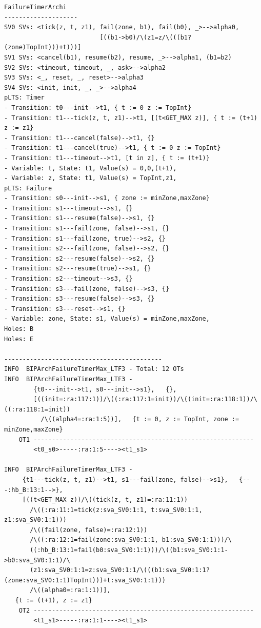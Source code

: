 \documentclass{llncs}
\begin{document}
\small\begin{verbatim}
FailureTimerArchi
--------------------
SV0 SVs: <tick(z, t, z1), fail(zone, b1), fail(b0), _>-->alpha0,
                          [((b1->b0)/\(z1=z/\(((b1?(zone)TopInt)))+t)))]
SV1 SVs: <cancel(b1), resume(b2), resume, _>-->alpha1, (b1=b2)
SV2 SVs: <timeout, timeout, _, ask>-->alpha2
SV3 SVs: <_, reset, _, reset>-->alpha3
SV4 SVs: <init, init, _, _>-->alpha4
pLTS: Timer
- Transition: t0---init-->t1, { t := 0 z := TopInt}
- Transition: t1---tick(z, t, z1)-->t1, [(t<GET_MAX z)], { t := (t+1) z := z1}
- Transition: t1---cancel(false)-->t1, {}
- Transition: t1---cancel(true)-->t1, { t := 0 z := TopInt}
- Transition: t1---timeout-->t1, [t in z], { t := (t+1)}
- Variable: t, State: t1, Value(s) = 0,0,(t+1),
- Variable: z, State: t1, Value(s) = TopInt,z1,
pLTS: Failure
- Transition: s0---init-->s1, { zone := minZone,maxZone}
- Transition: s1---timeout-->s1, {}
- Transition: s1---resume(false)-->s1, {}
- Transition: s1---fail(zone, false)-->s1, {}
- Transition: s1---fail(zone, true)-->s2, {}
- Transition: s2---fail(zone, false)-->s2, {}
- Transition: s2---resume(false)-->s2, {}
- Transition: s2---resume(true)-->s1, {}
- Transition: s2---timeout-->s3, {}
- Transition: s3---fail(zone, false)-->s3, {}
- Transition: s3---resume(false)-->s3, {}
- Transition: s3---reset-->s1, {}
- Variable: zone, State: s1, Value(s) = minZone,maxZone,
Holes: B
Holes: E

-------------------------------------------
INFO  BIPArchFailureTimerMax_LTF3 - Total: 12 OTs
INFO  BIPArchFailureTimerMax_LTF3 -
        {t0---init-->t1, s0---init-->s1},   {},   
        [((init=:ra:117:1))/\((:ra:117:1=init))/\((init=:ra:118:1))/\((:ra:118:1=init))
          /\((alpha4=:ra:1:5))],   {t := 0, z := TopInt, zone := minZone,maxZone}
    OT1 ------------------------------------------------------------
        <t0_s0>-----:ra:1:5----><t1_s1>

INFO  BIPArchFailureTimerMax_LTF3 -
     {t1---tick(z, t, z1)-->t1, s1---fail(zone, false)-->s1},   {---:hb_B:13:1-->},   
     [((t<GET_MAX z))/\((tick(z, t, z1)=:ra:11:1))
       /\((:ra:11:1=tick(z:sva_SV0:1:1, t:sva_SV0:1:1, z1:sva_SV0:1:1)))
       /\((fail(zone, false)=:ra:12:1))
       /\((:ra:12:1=fail(zone:sva_SV0:1:1, b1:sva_SV0:1:1)))/\
       ((:hb_B:13:1=fail(b0:sva_SV0:1:1)))/\((b1:sva_SV0:1:1->b0:sva_SV0:1:1)/\
       (z1:sva_SV0:1:1=z:sva_SV0:1:1/\(((b1:sva_SV0:1:1?(zone:sva_SV0:1:1)TopInt)))+t:sva_SV0:1:1)))
       /\((alpha0=:ra:1:1))],
   {t := (t+1), z := z1}
    OT2 ------------------------------------------------------------
        <t1_s1>-----:ra:1:1----><t1_s1>


\end{verbatim}
\end{document}
